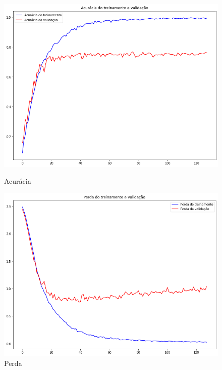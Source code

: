 \documentclass[12pt]{article}
\begin{document}
\begin{figure}[!htb]
  \begin{minipage}{.47\textwidth}
    \centering
    \includegraphics[width=1.1\linewidth]{experiments/default_noaug_128/accuracy.png}
    \caption{Acurácia}\label{fig:experiment_default_noaug_128_accuracy}
  \end{minipage}\hfill
  \begin{minipage}{.47\textwidth}
    \centering
    \includegraphics[width=1.1\linewidth]{experiments/default_noaug_128/loss.png}
    \caption{Perda}\label{fig:experiment_default_noaug_128_loss}
  \end{minipage}
\end{figure}
\end{document}
